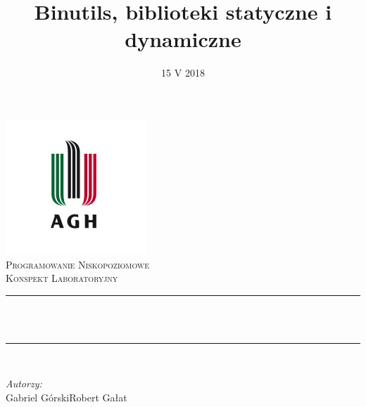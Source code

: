 \documentclass[12pt]{article}
\title{Binutils, biblioteki statyczne i dynamiczne} %
\author{} %
\date{15 V 2018} %
\begin{document}

\begin{titlepage}
  \centering \vspace*{0.5 cm} \includegraphics[scale = 0.75]{agh.jpg}\\[1.0
  cm] %
  \textsc{\Large Programowanie Niskopoziomowe}\\[0.5 cm] %
  \textsc{\large Konspekt Laboratoryjny}\\[0.5 cm] %
  \rule{\linewidth}{0.2 mm} \\[0.4 cm]
  { \huge \bfseries \thetitle}\\
  \rule{\linewidth}{0.2 mm} \\[1.5 cm]

  \begin{minipage}{0.4\textwidth}
    \begin{flushleft} \large \vspace{3cm}
      \emph{Autorzy:}\\
      Gabriel Górski\newline Robert Gałat %
    \end{flushleft}
  \end{minipage}~
  \begin{minipage}{0.4\textwidth}
    \begin{flushright} \large
    \end{flushright}
  \end{minipage}\\[2 cm]

  {\large \thedate}\\[2 cm]

  \vfill

\end{titlepage}
\end{document}
